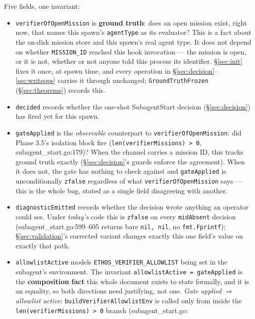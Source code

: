 \documentclass[a4paper,10pt,fleqn]{article}
\newcommand{\field}[1]{\texttt{#1}}
\begin{document}
Five fields, one invariant:

\begin{itemize}
  \item \field{verifierOfOpenMission} is \textbf{ground truth}: does
    an open mission exist, right now, that names this spawn's
    \field{agentType} as its evaluator? This is a fact about the
    on-disk mission store and this spawn's real agent type. It does
    not depend on whether \field{MISSION\_ID} reached this hook
    invocation --- the mission is open, or it is not, whether or not
    anyone told this process its identifier. \S\ref{sec:init} fixes
    it once, at spawn time, and every operation in
    \S\ref{sec:decision}--\ref{sec:writeops} carries it through
    unchanged; \field{GroundTruthFrozen} (\S\ref{sec:theorems})
    records this.
  \item \field{decided} records whether the one-shot SubagentStart
    decision (\S\ref{sec:decision}) has fired yet for this spawn.
  \item \field{gateApplied} is the \emph{observable} counterpart to
    \field{verifierOfOpenMission}: did Phase 3.5's isolation block
    fire (\field{len(verifierMissions) > 0},
    subagent\_start.go:179)? When the channel carries a mission ID,
    this tracks ground truth exactly (\S\ref{sec:decision}'s guards
    enforce the agreement). When it does not, the gate has nothing to
    check against and \field{gateApplied} is unconditionally
    \field{zfalse} regardless of what \field{verifierOfOpenMission}
    says --- this is the whole bug, stated as a single field
    disagreeing with another.
  \item \field{diagnosticEmitted} records whether the decision wrote
    anything an operator could see. Under \emph{today's} code this is
    \field{zfalse} on every \field{midAbsent} decision
    (subagent\_start.go:599--605 returns bare \field{nil, nil}, no
    \field{fmt.Fprintf}); \S\ref{sec:validation}'s corrected variant
    changes exactly this one field's value on exactly that path.
  \item \field{allowlistActive} models
    \field{ETHOS\_VERIFIER\_ALLOWLIST} being set in the subagent's
    environment. The invariant
    \field{allowlistActive = gateApplied} is the \textbf{composition
    fact} this whole document exists to state formally, and it is an
    equality, so both directions need justifying, not one.
    \emph{Gate applied $\Rightarrow$ allowlist active}:
    \field{buildVerifierAllowlistEnv} is called only from inside the
    \field{len(verifierMissions) > 0} branch (subagent\_start.go:

\end{itemize}
\end{document}
